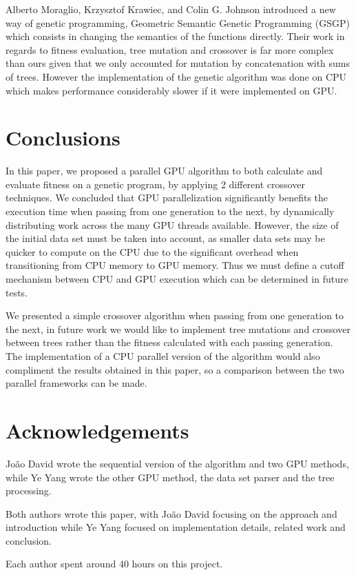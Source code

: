 \documentclass[runningheads]{llncs}
\begin{document}
Alberto Moraglio, Krzysztof Krawiec, and Colin G. Johnson introduced a new way of genetic programming, Geometric Semantic Genetic Programming (GSGP) which consists in changing the semantics of the functions directly. Their work in regards to fitness evaluation, tree mutation and crossover is far more complex than ours given that we only accounted for mutation by concatenation with sums of trees. However the implementation of the genetic algorithm was done on CPU which makes performance considerably slower if it were implemented on GPU.


\section{Conclusions}

In this paper, we proposed a parallel GPU algorithm to both calculate and evaluate fitness on a genetic program, by applying 2 different crossover techniques. We concluded that GPU parallelization significantly benefits the execution time when passing from one generation to the next, by dynamically distributing work across the many GPU threads available. However, the size of the initial data set must be taken into account, as smaller data sets may be quicker to compute on the CPU due to the significant overhead when transitioning from CPU memory to GPU memory. Thus we must define a cutoff mechanism between CPU and GPU execution which can be determined in future tests.

We presented a simple crossover algorithm when passing from one generation to the next, in future work we would like to implement tree mutations and crossover between trees rather than the fitness calculated with each passing generation. The implementation of a CPU parallel version of the algorithm would also compliment the results obtained in this paper, so a comparison between the two parallel frameworks can be made.

\section*{Acknowledgements}

João David wrote the sequential version of the algorithm and two GPU methods, while Ye Yang wrote the other GPU method, the data set parser and the tree processing.

Both authors wrote this paper, with João David focusing on the approach and introduction while Ye Yang focused on implementation details, related work and conclusion.

Each author spent around 40 hours on this project.



\end{document}
